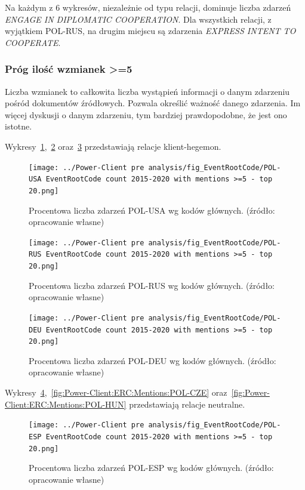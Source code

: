 \documentclass[11pt]{report}
\begin{document}
    Na każdym z 6 wykresów, niezależnie od typu relacji, dominuje liczba zdarzeń \textit{ENGAGE IN DIPLOMATIC COOPERATION}.
    Dla wszystkich relacji, z wyjątkiem POL-RUS, na drugim miejscu są zdarzenia \textit{EXPRESS INTENT TO COOPERATE}.

    \subsubsection{Próg ilość wzmianek >=5}
    Liczba wzmianek to całkowita liczba wystąpień informacji o danym zdarzeniu pośród dokumentów źródłowych.
    Pozwala określić ważność danego zdarzenia.
    Im więcej dyskusji o danym zdarzeniu, tym bardziej prawdopodobne, że jest ono istotne.

    Wykresy~\ref{fig:Power-Client:ERC:Mentions:POL-USA},~\ref{fig:Power-Client:ERC:Mentions:POL-RUS} oraz~\ref{fig:Power-Client:ERC:Mentions:POL-DEU} przedstawiają relacje klient-hegemon.
    \begin{figure}[!htp]
        \centering
        \texttt{[image: ../Power-Client pre analysis/fig\_EventRootCode/POL-USA EventRootCode count 2015-2020 with mentions >=5 - top 20.png]}
        \caption{Procentowa liczba zdarzeń POL-USA wg kodów głównych. (źródło: opracowanie własne)}
        \label{fig:Power-Client:ERC:Mentions:POL-USA}
    \end{figure}

    \begin{figure}[!htp]
        \centering
        \texttt{[image: ../Power-Client pre analysis/fig\_EventRootCode/POL-RUS EventRootCode count 2015-2020 with mentions >=5 - top 20.png]}
        \caption{Procentowa liczba zdarzeń POL-RUS wg kodów głównych. (źródło: opracowanie własne)}
        \label{fig:Power-Client:ERC:Mentions:POL-RUS}
    \end{figure}

    \begin{figure}[!htp]
        \centering
        \texttt{[image: ../Power-Client pre analysis/fig\_EventRootCode/POL-DEU EventRootCode count 2015-2020 with mentions >=5 - top 20.png]}
        \caption{Procentowa liczba zdarzeń POL-DEU wg kodów głównych. (źródło: opracowanie własne)}
        \label{fig:Power-Client:ERC:Mentions:POL-DEU}
    \end{figure}

    Wykresy~\ref{fig:Power-Client:ERC:Mentions:POL-ESP},~\ref{fig:Power-Client:ERC:Mentions:POL-CZE} oraz~\ref{fig:Power-Client:ERC:Mentions:POL-HUN} przedstawiają relacje neutralne.
    \begin{figure}[!htp]
        \centering
        \texttt{[image: ../Power-Client pre analysis/fig\_EventRootCode/POL-ESP EventRootCode count 2015-2020 with mentions >=5 - top 20.png]}
        \caption{Procentowa liczba zdarzeń POL-ESP wg kodów głównych. (źródło: opracowanie własne)}
        \label{fig:Power-Client:ERC:Mentions:POL-ESP}
    \end{figure}
\end{document}
